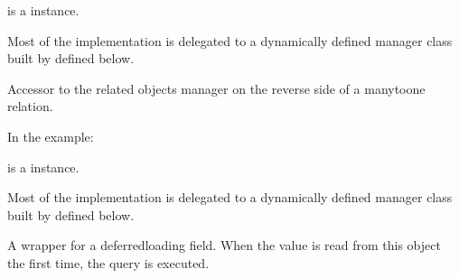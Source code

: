 \documentclass[letterpaper,10pt,english]{sphinxmanual}
\begin{document}
\begin{fulllineitems}
\begin{fulllineitems}
\sphinxAtStartPar
{} is a  instance.

\sphinxAtStartPar
Most of the implementation is delegated to a dynamically defined manager
class built by  defined below.

\end{fulllineitems}


\begin{fulllineitems}
\label{\detokenize{users:users.models.CustomUser.theme_updated_by}}
\pysigstartsignatures
\pysigline
{}
\pysigstopsignatures
\sphinxAtStartPar
Accessor to the related objects manager on the reverse side of a
many\sphinxhyphen{}to\sphinxhyphen{}one relation.

\sphinxAtStartPar
In the example:

\begin{sphinxVerbatim}[commandchars=\\\{\}]
       
\end{sphinxVerbatim}

\sphinxAtStartPar
{} is a  instance.

\sphinxAtStartPar
Most of the implementation is delegated to a dynamically defined manager
class built by  defined below.

\end{fulllineitems}


\begin{fulllineitems}
\label{\detokenize{users:users.models.CustomUser.updated_at}}
\pysigstartsignatures
\pysigline
{}
\pysigstopsignatures
\sphinxAtStartPar
A wrapper for a deferred\sphinxhyphen{}loading field. When the value is read from this
object the first time, the query is executed.


\end{fulllineitems}
\end{fulllineitems}
\end{document}
